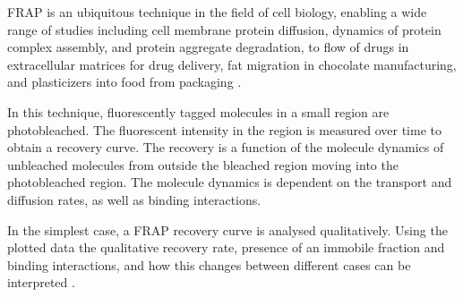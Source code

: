     FRAP is an ubiquitous technique in the field of cell biology,
    enabling a wide range of studies
    including cell membrane protein diffusion, dynamics of
    protein complex assembly, and protein aggregate degradation, to
    flow of drugs in extracellular matrices for drug delivery, fat
    migration in chocolate manufacturing, and plasticizers into food
    from packaging
    \citep{frap-review-2005,mcnally-frap-2010,frap-review-2015}.

    In this technique, fluorescently tagged molecules in a small region
    are photobleached.  The fluorescent intensity in the region is
    measured over time to obtain a recovery curve.  The recovery is a
    function of the molecule dynamics of unbleached
    molecules from outside the bleached region moving into the
    photobleached region.  The molecule dynamics is dependent on the
    transport and diffusion rates, as well as binding interactions.

    In the simplest case, a FRAP recovery curve is analysed
    qualitatively.  Using the plotted data the qualitative
    recovery rate, presence of an immobile
    fraction and binding interactions, and how this changes
    between different cases can be interpreted
    .

